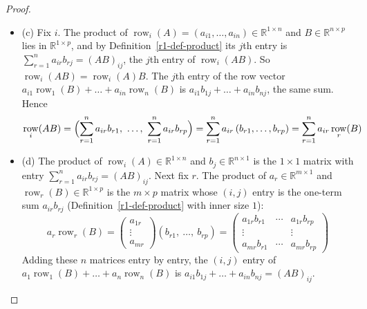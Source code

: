 \documentclass[12pt]{article}
\newcommand{\R}{\mathbb R}
\DeclareMathOperator{\row}{row}
\theoremstyle{definition}
\begin{document}
\begin{proof}
\begin{itemize}
\[=x_1a_1+\dots+x_na_n
\]
For \(x=e_j\) we have \(x_j=1\) and \(x_r=0\) for \(r\ne j\), so \(Ae_j=1\cdot a_j=a_j\).
\item (c) Fix \(i\). The product of \(\row_i(A)=(a_{i1},\dots,a_{in})\in\R^{1\times n}\) and
\(B\in\R^{n\times p}\) lies in \(\R^{1\times p}\), and by Definition~\ref{r1-def-product} its
\(j\)th entry is \(\sum_{r=1}^n a_{ir}b_{rj}=(AB)_{ij}\), the \(j\)th entry of \(\row_i(AB)\).
So \(\row_i(AB)=\row_i(A)B\). The \(j\)th entry of the row vector
\(a_{i1}\row_1(B)+\dots+a_{in}\row_n(B)\) is \(a_{i1}b_{1j}+\dots+a_{in}b_{nj}\), the same
sum. Hence
\[
\row_i(AB)=\Bigl(\sum_{r=1}^n a_{ir}b_{r1},\ \dots,\ \sum_{r=1}^n a_{ir}b_{rp}\Bigr)
=\sum_{r=1}^n a_{ir}\,(b_{r1},\dots,b_{rp})=\sum_{r=1}^n a_{ir}\row_r(B)
\]
\item (d) The product of \(\row_i(A)\in\R^{1\times n}\) and \(b_j\in\R^{n\times1}\) is the
\(1\times1\) matrix with entry \(\sum_{r=1}^n a_{ir}b_{rj}=(AB)_{ij}\). Next fix \(r\). The
product of \(a_r\in\R^{m\times1}\) and \(\row_r(B)\in\R^{1\times p}\) is the \(m\times p\)
matrix whose \((i,j)\) entry is the one-term sum \(a_{ir}b_{rj}\)
(Definition~\ref{r1-def-product} with inner size \(1\)):
\[
a_r\row_r(B)=\begin{pmatrix}a_{1r}\\\vdots\\a_{mr}\end{pmatrix}(b_{r1},\ \dots,\ b_{rp})
=\begin{pmatrix}a_{1r}b_{r1}&\cdots&a_{1r}b_{rp}\\\vdots&&\vdots\\a_{mr}b_{r1}&\cdots&a_{mr}b_{rp}\end{pmatrix}
\]
Adding these \(n\) matrices entry by entry, the \((i,j)\) entry of
\(a_1\row_1(B)+\dots+a_n\row_n(B)\) is \(a_{i1}b_{1j}+\dots+a_{in}b_{nj}=(AB)_{ij}\).\qedhere
\end{itemize}
\end{proof}
\end{document}
